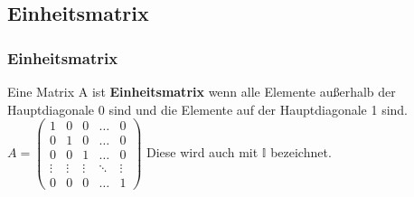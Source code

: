 \subsection{Einheitsmatrix}
\begin{frame}
\frametitle{Einheitsmatrix}
Eine Matrix A ist \textbf{Einheitsmatrix} wenn alle Elemente außerhalb der Hauptdiagonale 0 sind und die Elemente auf der Hauptdiagonale 1 sind.\\
$A = \begin{pmatrix}
1 & 0 & 0 & \dots & 0\\
0 & 1 & 0 & \dots & 0\\
0 & 0 & 1 & \dots & 0\\
\vdots & \vdots & \vdots & \ddots & \vdots\\
0 & 0 & 0 & \dots & 1
\end{pmatrix}$
Diese wird auch mit $\mathds{I}$ bezeichnet.
\end{frame}
